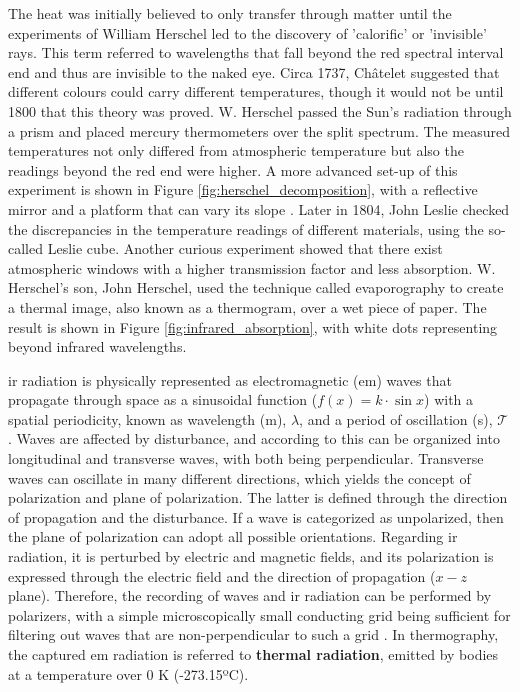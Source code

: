 \begin{kaobox}[frametitle=Discovery of infrared radiation]
The heat was initially believed to only transfer through matter until the experiments of William Herschel led to the discovery of 'calorific' or 'invisible' rays. This term referred to wavelengths that fall beyond the red spectral interval end and thus are invisible to the naked eye. Circa 1737, Châtelet suggested that different colours could carry different temperatures, though it would not be until 1800 that this theory was proved. W. Herschel passed the Sun's radiation through a prism and placed mercury thermometers over the split spectrum. The measured temperatures not only differed from atmospheric temperature but also the readings beyond the red end were higher. A more advanced set-up of this experiment is shown in Figure \ref{fig:herschel_decomposition}, with a reflective mirror and a platform that can vary its slope \cite{ring_discovery_2000, minkina_how_2021, minkina_infrared_2009}. Later in 1804, John Leslie checked the discrepancies in the temperature readings of different materials, using the so-called Leslie cube. Another curious experiment showed that there exist atmospheric windows with a higher transmission factor and less absorption. W. Herschel's son, John Herschel, used the technique called evaporography to create a thermal image, also known as a thermogram, over a wet piece of paper. The result is shown in Figure \ref{fig:infrared_absorption}, with white dots representing beyond infrared wavelengths. 
\end{kaobox}

\acrshort{ir} radiation is physically represented as electromagnetic (\acrshort{em}) waves that propagate through space as a sinusoidal function ($f(x) = k \cdot \sin{x}$) with a spatial periodicity, known as wavelength (\si{\meter}), $\lambda$, and a period of oscillation (\si{\second}), $\mathcal{T}$. 
Waves are affected by disturbance, and according to this can be organized into longitudinal and transverse waves, with both being perpendicular. Transverse waves can oscillate in many different directions, which yields the concept of polarization and plane of polarization. The latter is defined through the direction of propagation and the disturbance. If a wave is categorized as unpolarized, then the plane of polarization can adopt all possible orientations. Regarding \acrshort{ir} radiation, it is perturbed by electric and magnetic fields, and its polarization is expressed through the electric field and the direction of propagation ($x-z$ plane). Therefore, the recording of waves and \acrshort{ir} radiation can be performed by polarizers, with a simple microscopically small conducting grid being sufficient for filtering out waves that are non-perpendicular to such a grid \cite{vollmer_infrared_2017}. In thermography, the captured \acrshort{em} radiation is referred to \textbf{thermal radiation}, emitted by bodies at a temperature over 0 \si{\kelvin} (-273.15ºC). 

